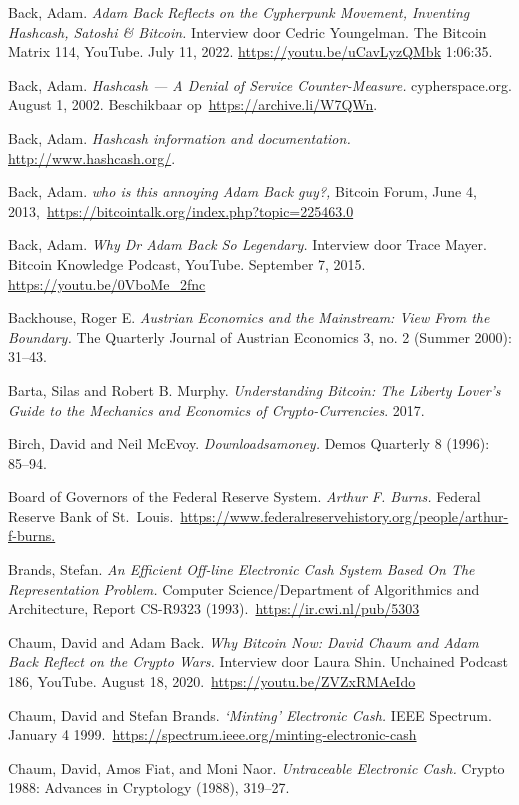 \documentclass[
  a5paper,
  smalldemyvopaper,11pt,twoside,onecolumn,openright,extrafontsizes,
hidelinks]{memoir}
\begin{document}
{Back, Adam. \emph{Adam Back Reflects on the Cypherpunk Movement,
Inventing Hashcash, Satoshi \& Bitcoin.} Interview door Cedric
Youngelman. The Bitcoin Matrix 114, YouTube. July 11, 2022.
\url{https://youtu.be/uCavLyzQMbk} 1:06:35.

Back, Adam. \emph{Hashcash --- A Denial of Service Counter-Measure.}
cypherspace.org. August 1, 2002. Beschikbaar
op~\url{https://archive.li/W7QWn}.

Back, Adam. \emph{Hashcash information and documentation.}
\url{http://www.hashcash.org/}.

Back, Adam. \emph{who is this annoying Adam Back guy?,} Bitcoin Forum,
June 4, 2013,~\url{https://bitcointalk.org/index.php?topic=225463.0}

Back, Adam. \emph{Why Dr Adam Back So Legendary.} Interview door Trace
Mayer. Bitcoin Knowledge Podcast, YouTube. September 7, 2015.
\url{https://youtu.be/0VboMe_2fnc}

Backhouse, Roger E. \emph{Austrian Economics and the Mainstream: View
From the Boundary.} The Quarterly Journal of Austrian Economics 3, no. 2
(Summer 2000): 31--43.

Barta, Silas and Robert B. Murphy. \emph{Understanding Bitcoin: The
Liberty Lover's Guide to the Mechanics and Economics of
Crypto-Currencies}. 2017.

Birch, David and Neil McEvoy. \emph{Downloadsamoney.} Demos Quarterly 8
(1996): 85--94.

Board of Governors of the Federal Reserve System. \emph{Arthur F.
Burns.} Federal Reserve Bank of
St.~Louis.~\url{https://www.federalreservehistory.org/people/arthur-f-burns.}

Brands, Stefan. \emph{An Efficient Off-line Electronic Cash System Based
On The Representation Problem.} Computer Science/Department of
Algorithmics and Architecture, Report CS-R9323
(1993).~\url{https://ir.cwi.nl/pub/5303}

Chaum, David and Adam Back. \emph{Why Bitcoin Now: David Chaum and Adam
Back Reflect on the Crypto Wars.} Interview door Laura Shin. Unchained
Podcast 186, YouTube. August 18,
2020.~\url{https://youtu.be/ZVZxRMAeIdo}

Chaum, David and Stefan Brands. \emph{`Minting' Electronic Cash.} IEEE
Spectrum. January 4
1999.~\url{https://spectrum.ieee.org/minting-electronic-cash}

Chaum, David, Amos Fiat, and Moni Naor. \emph{Untraceable Electronic
Cash.} Crypto 1988: Advances in Cryptology (1988), 319--27.

}
\end{document}
